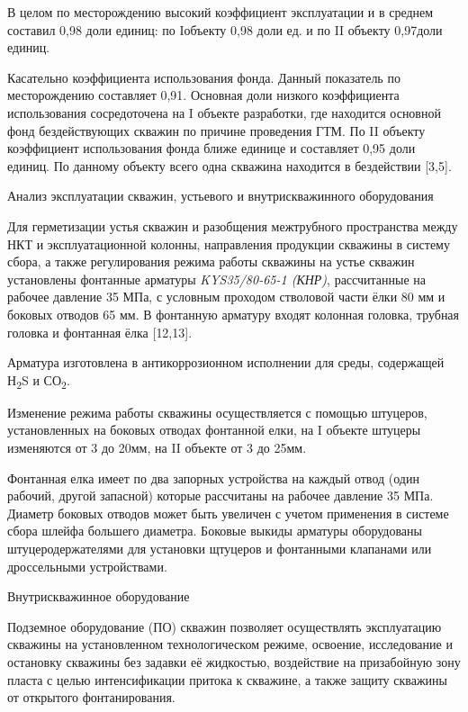 \begin{multicols}{2}
В целом по месторождению высокий коэффициент эксплуатации и в среднем
составил 0,98 доли единиц: по Iобъекту 0,98 доли ед. и по II объекту
0,97доли единиц.

Касательно коэффициента использования фонда. Данный показатель по
месторождению составляет 0,91. Основная доли низкого коэффициента
использования сосредоточена на I объекте разработки, где находится
основной фонд бездействующих скважин по причине проведения ГТМ. По II
объекту коэффициент использования фонда ближе единице и составляет 0,95
доли единиц. По данному объекту всего одна скважина находится в
бездействии {[}3,5{]}.

Анализ эксплуатации скважин, устьевого и внутрискважинного оборудования

Для герметизации устья скважин и разобщения межтрубного пространства
между НКТ и эксплуатационной колонны, направления продукции скважины в
систему сбора, а также регулирования режима работы скважины на устье
скважин установлены фонтанные арматуры \emph{KYS35/80-65-1 (КНР)},
рассчитанные на рабочее давление 35 МПа, с условным проходом стволовой
части ёлки 80 мм и боковых отводов 65 мм. В фонтанную арматуру входят
колонная головка, трубная головка и фонтанная ёлка {[}12,13{]}.

Арматура изготовлена в антикоррозионном исполнении для среды, содержащей
Н\textsubscript{2}S и СО\textsubscript{2}.

Изменение режима работы скважины осуществляется с помощью штуцеров,
установленных на боковых отводах фонтанной елки, на I объекте штуцеры
изменяются от 3 до 20мм, на II объекте от 3 до 25мм.

Фонтанная елка имеет по два запорных устройства на каждый отвод (один
рабочий, другой запасной) которые рассчитаны на рабочее давление 35 МПа.
Диаметр боковых отводов может быть увеличен с учетом применения в
системе сбора шлейфа большего диаметра. Боковые выкиды арматуры
оборудованы штуцеродержателями для установки щтуцеров и фонтанными
клапанами или дроссельными устройствами.

Внутрискважинное оборудование

Подземное оборудование (ПО) скважин позволяет осуществлять эксплуатацию
скважины на установленном технологическом режиме, освоение, исследование
и остановку скважины без задавки её жидкостью, воздействие на
призабойную зону пласта с целью интенсификации притока к скважине, а
также защиту скважины от открытого фонтанирования.
\end{multicols}

